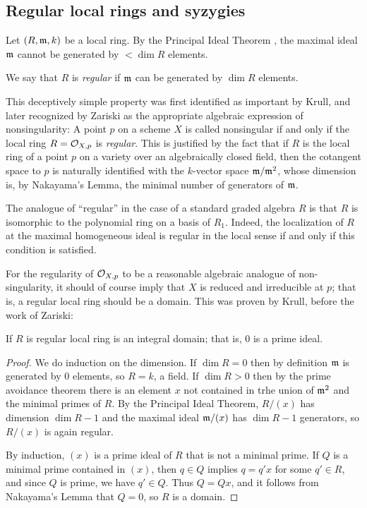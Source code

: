 \subsection{Regular local rings and syzygies}
Let $(R,\gm,k)$ be a local ring. By the Principal Ideal Theorem \cite[]{E}, the maximal ideal $\gm$ cannot be generated by  $<\dim R$ elements.

\begin{definition}
 We say that $R$ is \emph{regular} if $\gm$ can be generated by $\dim R$ elements.
\end{definition}

This deceptively simple property was first identified as important by Krull, and later recognized by Zariski as the appropriate algebraic expression of nonsingularity: A point $p$ on a scheme $X$ is called nonsingular if and only if the local ring $R = \sO_{X,p}$ is \emph{regular}. This is justified by the fact that if $R$ is the local ring of a point $p$ on a variety over an algebraically closed field, then the cotangent space to $p$ is naturally identified with the 
$k$-vector space $\gm/\gm^{2}$, whose dimension is, by Nakayama's Lemma, the minimal number of generators of $\gm$. 

The analogue of ``regular'' in the case of a standard graded algebra $R$ is that $R$ is isomorphic to the 
polynomial ring on a basis of $R_{1}$. Indeed, the localization of $R$ at the maximal homogeneous ideal is regular in the local sense if and only if this condition is satisfied.

For the regularity of $\sO_{X,p}$ to be a reasonable algebraic analogue of non-singularity, it should of course imply
that $X$ is reduced and irreducible at $p$; that is, a regular local ring should be a domain. This was proven by Krull, before the work of Zariski:

\begin{proposition}
 If $R$ is regular local ring is an integral domain; that is, 0 is a prime ideal.
\end{proposition}
\begin{proof}
 We do induction on the dimension. If $\dim R = 0$ then by definition $\gm$ is generated by 0 elements, so $R = k$,
 a field. If $\dim R>0$ then by the prime avoidance theorem \cite[]{E} there is an element $x$ not contained in trhe union of $\gm^{2}$ and the minimal primes of $R$. By the Principal Ideal Theorem, $R/(x)$ has dimension $\dim R -1$ and the maximal ideal $\gm/(x)$ has $\dim R-1$ generators, so $R/(x)$ is again regular.
 
 By induction, $(x)$ is a prime ideal of $R$ that is not a minimal prime. If $Q$ is a minimal prime contained in $(x)$,
 then $q\in Q$ implies $q = q'x$ for some $q'\in R$, and since $Q$ is prime, we have $q'\in Q$. Thus
 $Q = Qx$, and it follows from Nakayama's Lemma that $Q=0$, so $R$ is a domain.
\end{proof}


